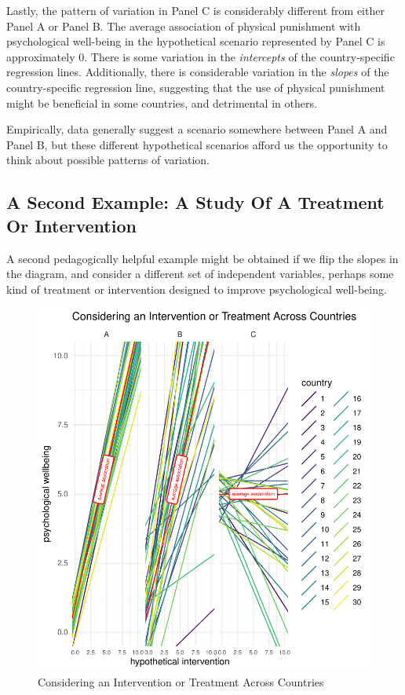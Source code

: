 \documentclass[
  letterpaper,
  DIV=11,
  numbers=noendperiod]{scrreprt}
\begin{document}
Lastly, the pattern of variation in Panel C is considerably different
from either Panel A or Panel B. The average association of physical
punishment with psychological well-being in the hypothetical scenario
represented by Panel C is approximately 0. There is some variation in
the \emph{intercepts} of the country-specific regression lines.
Additionally, there is considerable variation in the \emph{slopes} of
the country-specific regression line, suggesting that the use of
physical punishment might be beneficial in some countries, and
detrimental in others.

Empirically, data generally suggest a scenario somewhere between Panel A
and Panel B, but these different hypothetical scenarios afford us the
opportunity to think about possible patterns of variation.

\hypertarget{a-second-example-a-study-of-a-treatment-or-intervention}{%
\subsection{A Second Example: A Study Of A Treatment Or
Intervention}\label{a-second-example-a-study-of-a-treatment-or-intervention}}

A second pedagogically helpful example might be obtained if we flip the
slopes in the diagram, and consider a different set of independent
variables, perhaps some kind of treatment or intervention designed to
improve psychological well-being.

\begin{figure}

{\centering \includegraphics{./conceptual-framework_files/figure-pdf/fig-variation2-1.pdf}

}

\caption{\label{fig-variation2}Considering an Intervention or Treatment
Across Countries}

\end{figure}
\end{document}
